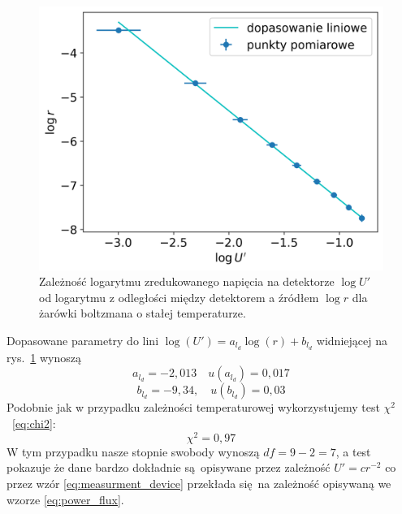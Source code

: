 \documentclass[12pt]{article}
\begin{document}
\begin{figure}[H]
    \centering
    \includegraphics[scale=0.5]{boltzman_distance}
    \caption{Zależność logarytmu zredukowanego napięcia na detektorze $\log{U'}$ od logarytmu z odległości między detektorem a źródłem $\log{r}$ dla żarówki boltzmana o stałej temperaturze.}
    \label{fig:boltzman_distance}
\end{figure}

Dopasowane parametry do lini $\log(U') = a_{l_d} \log(r) + b_{l_d}$ widniejącej na rys.~\ref{fig:boltzman_distance} wynoszą
\[
    a_{l_d} = -2{,}013 \quad u(a_{l_d}) = 0{,}017
\]
\[
    b_{l_d} = -9{,}34, \quad u(b_{l_d}) = 0{,}03
\]
Podobnie jak w przypadku zależności temperaturowej wykorzystujemy test $\chi^2$~\eqref{eq:chi2}:
\[
    \chi^2 = 0{,}97
\]
W tym przypadku nasze stopnie swobody wynoszą $df = 9 - 2 = 7$, a test pokazuje że dane bardzo dokładnie są opisywane przez zależność $U' = cr^{-2}$ co przez wzór \eqref{eq:measurment_device} przekłada się na zależność opisywaną we wzorze \eqref{eq:power_flux}.
\end{document}
